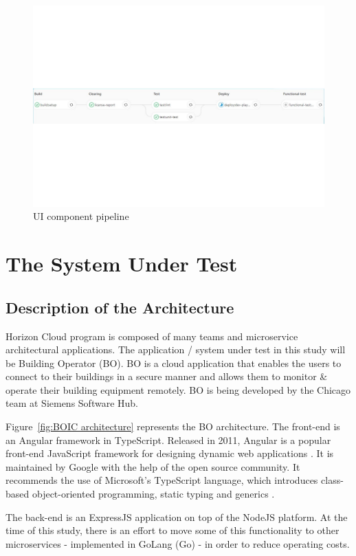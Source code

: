 \documentclass[conference]{IEEEtran}
\begin{document}
	\begin{figure}[!t]
		\centering
		\includegraphics[width=1.00\textwidth]{UIpipeline.pdf}
		\caption{UI component pipeline}
		\label{fig:UIpipeline}
	\end{figure}

\section{The System Under Test}
	\subsection{Description of the Architecture}
	
	Horizon Cloud program is composed of many teams and microservice architectural applications.
	The application / system under test in this study will be Building Operator (BO).
	BO is a cloud application that enables the users to connect to their buildings in a secure manner and allows them to monitor \& operate their building equipment remotely.
	BO is being developed by the Chicago team at Siemens Software Hub. 

	Figure~\ref{fig:BOIC architecture} represents the BO architecture.
	The front-end is an Angular framework in TypeScript.
	Released in 2011, Angular is a popular front-end JavaScript framework for designing dynamic web applications \cite{wiki:angular}.
	It is maintained by Google with the help of the open source community.
	It recommends the use of Microsoft's TypeScript language, which introduces class-based object-oriented programming, static typing and generics \cite{wiki:typescript}.
	
	The back-end is an ExpressJS application on top of the NodeJS platform. 
	At the time of this study, there is an effort to move some of this functionality to other microservices - implemented in GoLang (Go) - in order to reduce operating costs.
	
\end{document}
